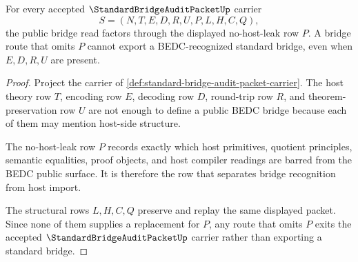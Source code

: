 \begin{theorem}
\label{thm:standard-bridge-audit-packet-nonhost-leak}
For every accepted $\StandardBridgeAuditPacketUp$ carrier
$$
S=(N,T,E,D,R,U,P,L,H,C,Q),
$$
the public bridge read factors through the displayed no-host-leak row $P$. A bridge route that omits $P$ cannot export a BEDC-recognized standard bridge, even when $E,D,R,U$ are present.
\end{theorem}
\begin{proof}
Project the carrier of \autoref{def:standard-bridge-audit-packet-carrier}. The host theory row $T$, encoding row $E$, decoding row $D$, round-trip row $R$, and theorem-preservation row $U$ are not enough to define a public BEDC bridge because each of them may mention host-side structure.

The no-host-leak row $P$ records exactly which host primitives, quotient principles, semantic equalities, proof objects, and host compiler readings are barred from the BEDC public surface. It is therefore the row that separates bridge recognition from host import.

The structural rows $L,H,C,Q$ preserve and replay the same displayed packet. Since none of them supplies a replacement for $P$, any route that omits $P$ exits the accepted $\StandardBridgeAuditPacketUp$ carrier rather than exporting a standard bridge.
\end{proof}

